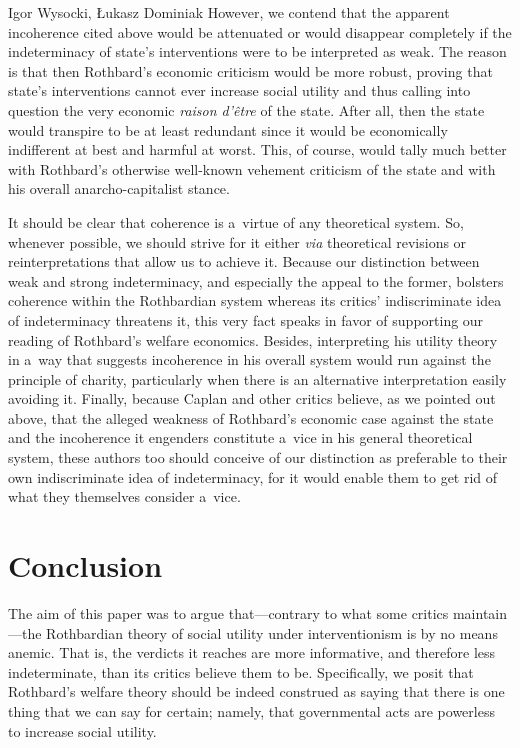 \begin{artengenv}{Igor Wysocki, Łukasz Dominiak}
However, we contend that the apparent incoherence cited above would be attenuated or would disappear completely if the indeterminacy of state's interventions were to be interpreted as weak. The reason is that then Rothbard's economic criticism would be more robust, proving that state's interventions cannot ever increase social utility and thus calling into question the very economic \textit{raison d'être} of the state. After all, then the state would transpire to be at least redundant since it would be economically indifferent at best and harmful at worst. This, of course, would tally much better with Rothbard's otherwise well-known vehement criticism of the state and with his overall anarcho-capitalist stance.



It should be clear that coherence is a~virtue of any theoretical system. So, whenever possible, we should strive for it either \textit{via} theoretical revisions or reinterpretations that allow us to achieve it. Because our distinction between weak and strong indeterminacy, and especially the appeal to the former, bolsters coherence within the Rothbardian system whereas its critics' indiscriminate idea of indeterminacy threatens it, this very fact speaks in favor of supporting our reading of Rothbard's welfare economics. Besides, interpreting his utility theory in a~way that suggests incoherence in his overall system would run against the principle of charity, particularly when there is an alternative interpretation easily avoiding it. Finally, because Caplan and other critics believe, as we pointed out above, that the alleged weakness of Rothbard's economic case against the state and the incoherence it engenders constitute a~vice in his general theoretical system, these authors too should conceive of our distinction as preferable to their own indiscriminate idea of indeterminacy, for it would enable them to get rid of what they themselves consider a~vice.



\section{Conclusion }

The aim of this paper was to argue that---contrary to what some critics maintain---the Rothbardian theory of social utility under interventionism is by no means anemic. That is, the verdicts it reaches are more informative, and therefore less indeterminate, than its critics believe them to be. Specifically, we posit that Rothbard's welfare theory should be indeed construed as saying that there is one thing that we can say for certain; namely, that governmental acts are powerless to increase social utility.




\end{artengenv}
